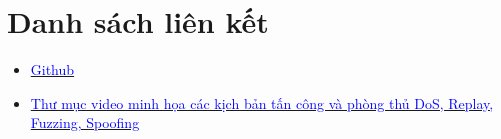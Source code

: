 \chapter*{Danh sách liên kết}

\begin{itemize}[leftmargin=*]
    \item \href{https://github.com/vnulic/CAN-ESP32.git}{\textcolor{blue}{Github}}
    \item \href{https://drive.google.com/drive/folders/1q_ydLcVppM0UkqJ5nY256r0bSRisEmvg}{\textcolor{blue}{Thư mục video minh họa các kịch bản tấn công và phòng thủ DoS, Replay, Fuzzing, Spoofing}}
\end{itemize}
